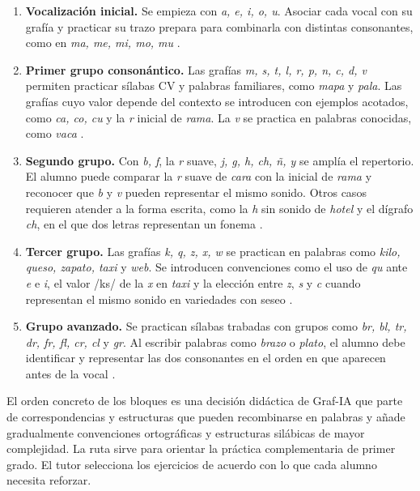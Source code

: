 \begin{enumerate}
    \item \textbf{Vocalización inicial.} Se empieza con \textit{a, e, i, o, u}. Asociar cada vocal con su grafía y practicar su trazo prepara para combinarla con distintas consonantes, como en \textit{ma, me, mi, mo, mu} \cite{sep2024fase3,bid2022aprendamos}.
    \item \textbf{Primer grupo consonántico.} Las grafías \textit{m, s, t, l, r, p, n, c, d, v} permiten practicar sílabas CV y palabras familiares, como \textit{mapa} y \textit{pala}. Las grafías cuyo valor depende del contexto se introducen con ejemplos acotados, como \textit{ca, co, cu} y la \textit{r} inicial de \textit{rama}. La \textit{v} se practica en palabras conocidas, como \textit{vaca} \cite{bid2022aprendamos,raeApendiceOrtografia}.
    \item \textbf{Segundo grupo.} Con \textit{b, f}, la \textit{r} suave, \textit{j, g, h, ch, ñ, y} se amplía el repertorio. El alumno puede comparar la \textit{r} suave de \textit{cara} con la inicial de \textit{rama} y reconocer que \textit{b} y \textit{v} pueden representar el mismo sonido. Otros casos requieren atender a la forma escrita, como la \textit{h} sin sonido de \textit{hotel} y el dígrafo \textit{ch}, en el que dos letras representan un fonema \cite{raeApendiceOrtografia}.
    \item \textbf{Tercer grupo.} Las grafías \textit{k, q, z, x, w} se practican en palabras como \textit{kilo, queso, zapato, taxi} y \textit{web}. Se introducen convenciones como el uso de \textit{qu} ante \textit{e} e \textit{i}, el valor /ks/ de la \textit{x} en \textit{taxi} y la elección entre \textit{z}, \textit{s} y \textit{c} cuando representan el mismo sonido en variedades con seseo \cite{bid2022aprendamos,raeApendiceOrtografia}.
    \item \textbf{Grupo avanzado.} Se practican sílabas trabadas con grupos como \textit{br, bl, tr, dr, fr, fl, cr, cl} y \textit{gr}. Al escribir palabras como \textit{brazo} o \textit{plato}, el alumno debe identificar y representar las dos consonantes en el orden en que aparecen antes de la vocal \cite{martinez2020predictors}.
\end{enumerate}

El orden concreto de los bloques es una decisión didáctica de Graf-IA que parte de correspondencias y estructuras que pueden recombinarse en palabras y añade gradualmente convenciones ortográficas y estructuras silábicas de mayor complejidad. La ruta sirve para orientar la práctica complementaria de primer grado. El tutor selecciona los ejercicios de acuerdo con lo que cada alumno necesita reforzar.

